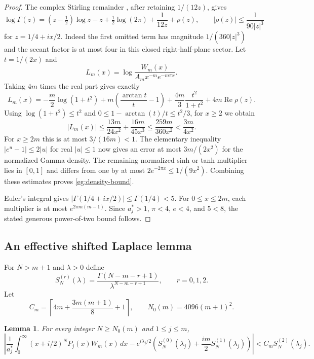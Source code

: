 \documentclass[11pt,a4paper]{article}
\numberwithin{equation}{section}
\newtheorem{lemma}[theorem]{Lemma}
\theoremstyle{definition}
\theoremstyle{remark}
\begin{document}
\begin{proof}
The complex Stirling remainder \cite[\S5.11(ii)]{DLMF}, after retaining $1/(12z)$, gives
\[
 \log\Gamma(z)=(z-\tfrac12)\log z-z+\tfrac12\log(2\pi)
                        +\frac1{12z}+\rho(z),\qquad
 |\rho(z)|\le\frac1{90|z|^3}
\]
for $z=1/4+ix/2$.  Indeed the first omitted term has magnitude
$1/(360|z|^3)$ and the secant factor is at most four in this
closed right-half-plane sector.  Let $t=1/(2x)$ and
\[
 L_m(x)=\log\frac{W_m(x)}{A_mx^{-m}e^{-m\pi x}}.
\]
Taking $4m$ times the real part gives exactly
\[
 L_m(x)=-\frac m2\log(1+t^2)
      +m\left(\frac{\arctan t}{t}-1\right)
      +\frac{4m}{3}\frac{t^2}{1+t^2}+4m\operatorname{Re}\rho(z).
\]
Using $\log(1+t^2)\le t^2$ and
$0\le1-\arctan(t)/t\le t^2/3$, for $x\ge2$ we obtain
\begin{equation}\label{eg:log-density}
 |L_m(x)|\le\frac{13m}{24x^2}+\frac{16m}{45x^3}
          \le\frac{259m}{360x^2}<\frac{3m}{4x^2}.
\end{equation}
For $x\ge2m$ this is at most $3/(16m)<1$.  The elementary
inequality $|e^u-1|\le2|u|$ for real $|u|\le1$ now gives
an error at most $3m/(2x^2)$ for the normalized Gamma density.
The remaining normalized sinh or tanh multiplier lies in $[0,1]$
and differs from one by at most $2e^{-2\pi x}\le1/(9x^2)$.
Combining these estimates proves \eqref{eg:density-bound}.

Euler's integral gives $|\Gamma(1/4+ix/2)|\le\Gamma(1/4)<5$.
For $0\le x\le2m$, each multiplier is at most
$e^{2\pi m(m-1)}$.  Since $a_j^*>1$, $\pi<4$, $e<4$,
and $5<8$, the stated generous power-of-two bound follows.
\end{proof}

\subsection{An effective shifted Laplace lemma}

For $N>m+1$ and $\lambda>0$ define
\[
 S_N^{(r)}(\lambda)=
       \frac{\Gamma(N-m-r+1)}{\lambda^{N-m-r+1}},
       \qquad r=0,1,2.
\]
Let
\begin{equation}\label{eg:constants}
 C_m=\left\lceil4m+\frac{3m(m+1)}8+1\right\rceil,
 \qquad N_0(m)=4096(m+1)^2.
\end{equation}

\begin{lemma}\label{eg:laplace}
For every integer $N\ge N_0(m)$ and $1\le j\le m$,
\begin{equation}\label{eg:laplace-bound}
 \left|\frac1{a_j^*}\int_0^\infty(x+i/2)^NP_j(x)W_m(x)\,dx
   -e^{i\lambda_j/2}\left(S_N^{(0)}(\lambda_j)
                 +\frac{im}{2}S_N^{(1)}(\lambda_j)\right)\right|
       < C_m S_N^{(2)}(\lambda_j).
\end{equation}
\end{lemma}
\end{document}

